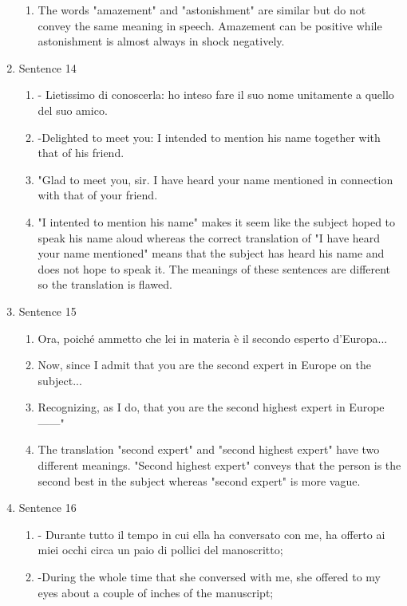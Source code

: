 \documentclass{article}
\begin{document}
\begin{enumerate}
\begin{enumerate}[label=(\alph*)]
        \item The words "amazement" and "astonishment" are similar but do not convey the same meaning in speech. 
            Amazement can be positive while astonishment is almost always in shock negatively.
    \end{enumerate}   
    \item Sentence 14
    \begin{enumerate}[label=(\alph*)]
        \item   - Lietissimo di conoscerla: ho inteso fare il suo nome unitamente a quello del suo amico.
        \item -Delighted to meet you: I intended to mention his name together with that of his friend.
        \item "Glad to meet you, sir. I have heard your name mentioned in connection with that of your friend.
        \item "I intented to mention his name" makes it seem like the subject hoped to speak his name aloud whereas the correct
            translation of "I have heard your name mentioned" means that the subject has heard his name and does not hope to speak it. 
            The meanings of these sentences are different so the translation is flawed. 
    \end{enumerate}   
    \item Sentence 15
    \begin{enumerate}[label=(\alph*)]
        \item  Ora, poiché ammetto che lei in materia è il secondo esperto d'Europa...
        \item Now, since I admit that you are the second expert in Europe on the subject...
        \item Recognizing, as I do, that you are the second highest expert in Europe ------"
        \item The translation "second expert" and "second highest expert" have two different meanings.
            "Second highest expert" conveys that the person is the second best in the subject whereas
            "second expert" is more vague.
    \end{enumerate}   
    \item Sentence 16
    \begin{enumerate}[label=(\alph*)]
        \item - Durante tutto il tempo in cui ella ha conversato con me, ha offerto ai miei occhi circa un paio di pollici del manoscritto;
        \item -During the whole time that she conversed with me, she offered to my eyes about a couple of inches of the manuscript;

\end{enumerate}
\end{enumerate}
\end{document}
